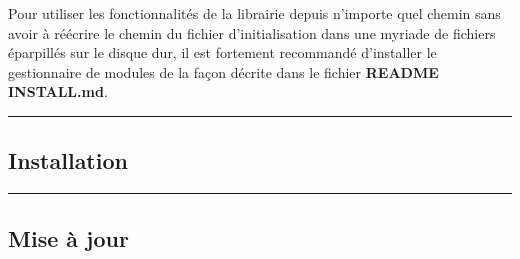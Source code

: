 \documentclass[a4paper,10pt]{article}
\begin{document}
\begin{justify}
    Pour utiliser les fonctionnalités de la librairie depuis n'importe quel chemin sans avoir à réécrire le chemin du fichier d'initialisation dans une myriade de fichiers éparpillés sur le disque dur, il est fortement recommandé d'installer le gestionnaire de modules de la façon décrite dans le fichier \textbf{\color{lime}README INSTALL.md}.
\end{justify}




\color{green}\par\noindent\rule{\textwidth}{0.4pt}\color{white}

\color{green}
\subsection{Installation}\color{white}

\begin{justify}

\end{justify}




\color{green}\par\noindent\rule{\textwidth}{0.4pt}\color{white}

\color{green}
\subsection{Mise à jour}\color{white}

\begin{justify}

\end{justify}
\end{document}
